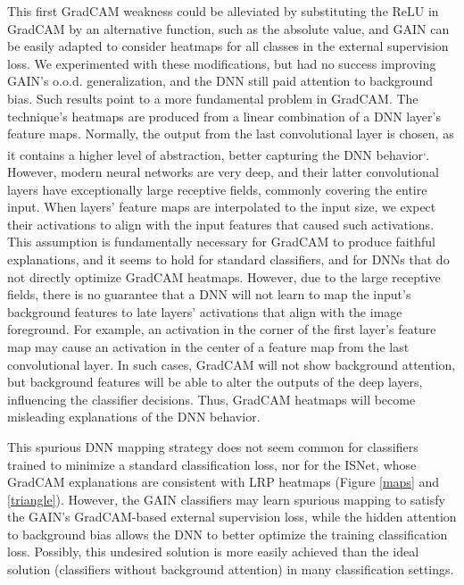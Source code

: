 \documentclass[fleqn,10pt]{wlscirep}
\begin{document}
{This first GradCAM weakness could be alleviated by substituting the ReLU in GradCAM by an alternative function, such as the absolute value, and GAIN can be easily adapted to consider heatmaps for all classes in the external supervision loss. We experimented with these modifications, but had no success improving GAIN's o.o.d. generalization, and the DNN still paid attention to background bias. Such results point to a more fundamental problem in GradCAM. The technique's heatmaps are produced from a linear combination of a DNN layer's feature maps. Normally, the output from the last convolutional layer is chosen, as it contains a higher level of abstraction, better capturing the DNN behavior\cite{GradCAM}\textsuperscript{,}\cite{GAIN}. However, modern neural networks are very deep, and their latter convolutional layers have exceptionally large receptive fields, commonly covering the entire input. When layers' feature maps are interpolated to the input size, we expect their activations to align with the input features that caused such activations. This assumption is fundamentally necessary for GradCAM to produce faithful explanations, and it seems to hold for standard classifiers, and for DNNs that do not directly optimize GradCAM heatmaps. However, due to the large receptive fields, there is no guarantee that a DNN will not learn to map the input's background features to late layers' activations that align with the image foreground. For example, an activation in the corner of the first layer's feature map may cause an activation in the center of a feature map from the last convolutional layer. In such cases, GradCAM will not show background attention, but background features will be able to alter the outputs of the deep layers, influencing the classifier decisions. Thus, GradCAM heatmaps will become misleading explanations of the DNN behavior.

This spurious DNN mapping strategy does not seem common for classifiers trained to minimize a standard classification loss, nor for the ISNet, whose GradCAM explanations are consistent with LRP heatmaps (Figure \ref{maps} and \ref{triangle}). However, the GAIN classifiers may learn spurious mapping to satisfy the GAIN's GradCAM-based external supervision loss, while the hidden attention to background bias allows the DNN to better optimize the training classification loss. Possibly, this undesired solution is more easily achieved than the ideal solution (classifiers without background attention) in many classification settings.

}
\end{document}
